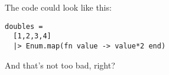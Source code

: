 The code could look like this:

\begin{verbatim}
doubles =
  [1,2,3,4]
  |> Enum.map(fn value -> value*2 end)
\end{verbatim}

And that's not too bad, right?
